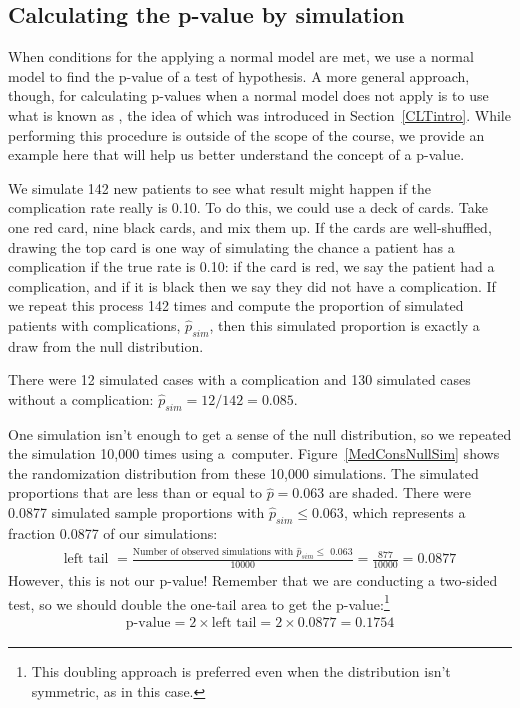 \D{\newpage}

\subsection{Calculating the p-value by simulation}
\label{calcPValueUsingSimulationSubSection}

When conditions for the applying a normal model are met, we use a normal model to find the p-value of a test of hypothesis. A more general approach, though, for calculating p-values when a normal model does not apply is to use what is known as , the idea of which was introduced in Section~\ref{CLTintro}. While performing this procedure is outside of the scope of the course, we provide an example here that will help us better understand the concept of a p-value.

We simulate 142 new patients to see what result might happen if the complication rate really is 0.10. To do this, we could use a deck of cards. Take one red card, nine black cards, and mix them up. If the cards are well-shuffled, drawing the top card is one way of simulating the chance a patient has a complication if the true rate is 0.10: if the card is red, we say the patient had a complication, and if it is black then we say they did not have a complication. If we repeat this process 142 times and compute the proportion of simulated patients with complications, $\hat{p}_{sim}$, then this simulated proportion is exactly a draw from the null distribution.

There were 12 simulated cases with a complication and 130 simulated cases without a complication: $\hat{p}_{sim} = 12 / 142 = 0.085$.

One simulation isn't enough to get a sense of the null distribution, so we repeated the simulation 10,000 times using a~computer. Figure~\ref{MedConsNullSim} shows the randomization distribution from these 10,000 simulations. The simulated proportions that are less than or equal to $\hat{p}=0.063$ are shaded. There were 0.0877 simulated sample proportions with $\hat{p}_{sim} \leq 0.063$, which represents a fraction 0.0877 of our simulations:
\begin{align*}
\text{left tail }
	= \frac{\text{Number of observed simulations with }\hat{p}_{sim}\leq\text{ 0.063}}{10000}
	= \frac{877}{10000} = 0.0877
\end{align*}
However, this is not our p-value! Remember that we are conducting a two-sided test, so we should double the one-tail area to get the p-value:\footnote{This doubling approach is preferred even when the distribution isn't symmetric, as in this case.}
\begin{align*}
\text{p-value} = 2 \times \text{left tail} = 2 \times 0.0877 = 0.1754
\end{align*}

